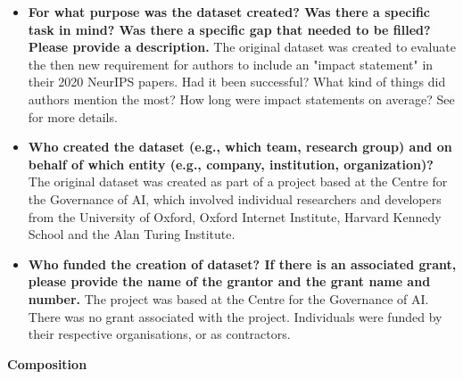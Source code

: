 \documentclass{article}
\begin{document}
\begin{itemize}
    \item \textbf{For what purpose was the dataset created? Was there a specific task in mind? Was there a specific gap that needed to be filled? Please provide a description.} The original dataset was created to evaluate the then new requirement for authors to include an "impact statement" in their 2020 NeurIPS papers. Had it been successful? What kind of things did authors mention the most? How long were impact statements on average? See \citep{ashurst2021aiethics} for more details.
    \item \textbf{Who created the dataset (e.g., which team, research group) and on behalf of which entity (e.g., company, institution, organization)?} The original dataset was created as part of a project based at the Centre for the Governance of AI, which involved individual researchers and developers from the University of Oxford, Oxford Internet Institute, Harvard Kennedy School and the Alan Turing Institute. 
    \item \textbf{Who funded the creation of dataset? If there is an associated grant, please provide the name of the grantor and the grant name and number.} The project was based at the Centre for the Governance of AI. There was no grant associated with the project. Individuals were funded by their respective organisations, or as contractors. 
\end{itemize}

\textbf{Composition}
\end{document}
